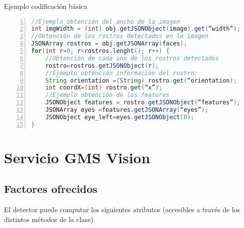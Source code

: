Ejemplo codificación básica 

\begin{lstlisting}[language=Java,numbers=left,numberstyle={\tiny},basicstyle={\footnotesize},breaklines=true,captionpos=t,frame=no,keywordstyle={\color{blue}},commentstyle={\color{gray}},stringstyle={\color{red}},numbersep=5pt,emph={label}]
//Ejemplo obtención del ancho de la imagen 
int imgWidth = (int) obj.getJSONObject(image).get(“width”); 
//Obtención de los rostros detectados en la imagen 
JSONArray rostros = obj.getJSONArray(faces); 
for(int r=0; r<rostros.lenght(); r++) {  	
	//Obtención de cada uno de los rostros detectados 
	rostro=rostros.getJSONObject(r);     	 
	//Ejemplo obtención información del rostro: 
	String orientation =(String) rostro.get(“orientation); 
	int coordX=(int) rostro.get(“x”); 
	//Ejemplo obtención de los features 
	JSONObject features = rostro.getJSONObject(“features”); 
	JSONArray eyes =features.getJSONArray(“eyes”); 
	JSONObject eye_left=eyes.getJSONObject(0); 
}
\end{lstlisting}



\section*{Servicio GMS Vision}


\subsection*{Factores ofrecidos}

El detector puede computar los siguientes atributos (accesibles a
través de los distintos métodos de la clase).

